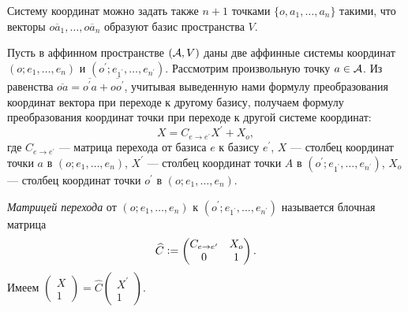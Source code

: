 \begin{remark}
    Систему координат можно задать также $n + 1$ точками $\{o, a_1, \ldots, a_n\}$ такими, что векторы $\overline{oa_1}, \ldots, \overline{oa_n}$ образуют базис пространства $V$.
\end{remark}

Пусть в аффинном пространстве $(\mathcal{A}, V)$ даны две аффинные системы координат $(o; e_1, \ldots, e_n)$ и $(o^\prime; e_{1^\prime}, \ldots, e_{n^\prime})$. Рассмотрим произвольную точку $a \in \mathcal{A}$. Из равенства $\overline{oa} = \overline{o^\prime a} + \overline{oo^\prime}$, учитывая выведенную нами формулу преобразования координат вектора при переходе к другому базису, получаем формулу преобразования координат точки при переходе к другой системе координат:
\[
    X = C_{e \to e^\prime}X^\prime + X_o,
\]
где $C_{e \to e^\prime}$ --- матрица перехода от базиса $e$ к базису $e^\prime$, $X$ --- столбец координат точки $a$ в $(o; e_1, \ldots, e_n)$, $X^\prime$ --- столбец координат точки $A$ в $(o^\prime; e_{1^\prime}, \ldots, e_{n^\prime})$, $X_o$ --- столбец координат точки $o^\prime$ в $(o; e_1, \ldots, e_n)$.

\begin{definition}
    \textit{Матрицей перехода} от $(o; e_1, \ldots, e_n)$ к $(o^\prime; e_{1^\prime}, \ldots, e_{n^\prime})$ называется блочная матрица
    \[
        \widehat{C} \vcentcolon =
        \begin{pmatrix}
            C_{e \to e^\prime} & X_o\\
            0 & 1
        \end{pmatrix}.
    \]
    Имеем
    $
    \begin{pmatrix}
        X\\
        1
    \end{pmatrix} = \widehat{C}
    \begin{pmatrix}
        X^\prime\\
        1
    \end{pmatrix}
    $.
\end{definition}

